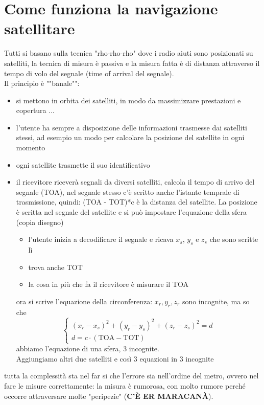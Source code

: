 \documentclass[oneside, 12pt]{extbook}
\begin{document}
\section{Come funziona la navigazione satellitare}
Tutti si basano sulla tecnica "rho-rho-rho" dove i radio aiuti sono posizionati su satelliti, la tecnica di misura è passiva e la misura fatta è di distanza attraverso il tempo di volo del segnale (time of arrival del segnale).\\
Il principio è ""banale"":
\begin{itemize}
	\item si mettono in orbita dei satelliti, in modo da massimizzare prestazioni e copertura ...
	\item l'utente ha sempre a disposizione delle informazioni trasmesse dai satelliti stessi, ad esempio un modo per calcolare la posizione del satellite in ogni momento
	\item ogni satellite trasmette il suo identificativo
	\item il ricevitore riceverà segnali da diversi satelliti, calcola il tempo di arrivo del segnale (TOA), nel segnale stesso c'è scritto anche l'istante temprale di trasmissione, quindi: (TOA - TOT)*c è la distanza del satellite. La posizione è scritta nel segnale del satellite e si può impostare l'equazione della sfera
	(copia disegno)
	\begin{itemize}
		\item l'utente inizia a decodificare il segnale e ricava $x_s$, $y_s$ e $z_s$ che sono scritte lì
		\item trova anche TOT
		\item la cosa in più che fa il ricevitore è misurare il TOA
	\end{itemize}
	ora si scrive l'equazione della circonferenza: $x_r, y_r, z_r$ sono incognite, ma so che
	\[
		\begin{cases}
			(x_r - x_s)^2 + (y_r - y_s)^2 + (z_r - z_s)^2 = d \\
			d = c \cdot (\text{TOA} - \text{TOT})
		\end{cases}
	\]
	abbiamo l'equazione di una sfera, 3 incognite.\\Aggiungiamo altri due satelliti e così 3 equazioni in 3 incognite
\end{itemize}
tutta la complessità sta nel far si che l'errore sia nell'ordine del metro, ovvero nel fare le misure correttamente: la misura è rumorosa, con molto rumore perché occorre attraversare molte "peripezie" (\textbf{C'È ER MARACANÀ}).\\
\end{document}
